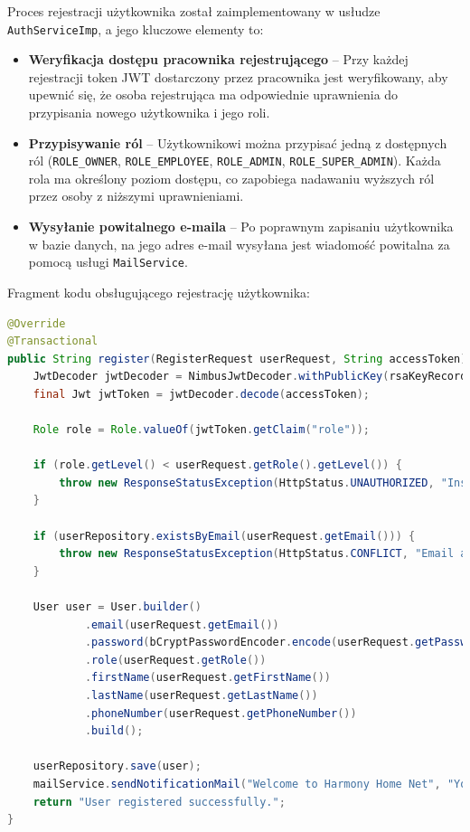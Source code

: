 Proces rejestracji użytkownika został zaimplementowany w usłudze \texttt{AuthServiceImp}, a jego kluczowe elementy to:
\begin{itemize}
    \item \textbf{Weryfikacja dostępu pracownika rejestrującego} -- Przy każdej rejestracji token JWT dostarczony przez pracownika jest weryfikowany, aby upewnić się, że osoba rejestrująca ma odpowiednie uprawnienia do przypisania nowego użytkownika i jego roli.
    \item \textbf{Przypisywanie ról} -- Użytkownikowi można przypisać jedną z dostępnych ról (\texttt{ROLE\_OWNER}, \texttt{ROLE\_EMPLOYEE}, \texttt{ROLE\_ADMIN}, \texttt{ROLE\_SUPER\_ADMIN}). Każda rola ma określony poziom dostępu, co zapobiega nadawaniu wyższych ról przez osoby z niższymi uprawnieniami.
    \item \textbf{Wysyłanie powitalnego e-maila} -- Po poprawnym zapisaniu użytkownika w bazie danych, na jego adres e-mail wysyłana jest wiadomość powitalna za pomocą usługi \texttt{MailService}.
\end{itemize}

Fragment kodu obsługującego rejestrację użytkownika:
\begin{lstlisting}[language=Java, style=JavaStyle, caption=Rejestracja użytkownika w \texttt{AuthServiceImp}]
@Override
@Transactional
public String register(RegisterRequest userRequest, String accessToken) {
    JwtDecoder jwtDecoder = NimbusJwtDecoder.withPublicKey(rsaKeyRecord.publicKey()).build();
    final Jwt jwtToken = jwtDecoder.decode(accessToken);

    Role role = Role.valueOf(jwtToken.getClaim("role"));

    if (role.getLevel() < userRequest.getRole().getLevel()) {
        throw new ResponseStatusException(HttpStatus.UNAUTHORIZED, "Insufficient permissions to update or assign the role");
    }

    if (userRepository.existsByEmail(userRequest.getEmail())) {
        throw new ResponseStatusException(HttpStatus.CONFLICT, "Email already exists");
    }

    User user = User.builder()
            .email(userRequest.getEmail())
            .password(bCryptPasswordEncoder.encode(userRequest.getPassword()))
            .role(userRequest.getRole())
            .firstName(userRequest.getFirstName())
            .lastName(userRequest.getLastName())
            .phoneNumber(userRequest.getPhoneNumber())
            .build();

    userRepository.save(user);
    mailService.sendNotificationMail("Welcome to Harmony Home Net", "Your account has been successfully created.", user.getEmail());
    return "User registered successfully.";
}
\end{lstlisting}

